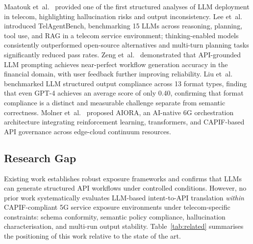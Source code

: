\documentclass[conference]{IEEEtran}
\begin{document}
Maatouk et~al.~\cite{maatouk2025} provided one of the first structured analyses
of LLM deployment in telecom, highlighting hallucination risks and output
inconsistency. Lee et~al.~\cite{telagentbench2025} introduced TelAgentBench,
benchmarking 15 LLMs across reasoning, planning, tool use, and RAG in a
telecom service environment; thinking-enabled models consistently outperformed
open-source alternatives and multi-turn planning tasks significantly reduced
pass rates. Zeng et~al.~\cite{flowmind2023} demonstrated that API-grounded LLM
prompting achieves near-perfect workflow generation accuracy in the financial
domain, with user feedback further improving reliability. Liu et~al.~\cite{liu2024}
benchmarked LLM structured output compliance across 13 format types, finding
that even GPT-4 achieves an average score of only 0.40, confirming that format
compliance is a distinct and measurable challenge separate from semantic
correctness. Molner et~al.~\cite{aiora2025} proposed AIORA, an AI-native 6G
orchestration architecture integrating reinforcement learning, transformers,
and CAPIF-based API governance across edge-cloud continuum resources.

\subsection{Research Gap}

Existing work establishes robust exposure frameworks and confirms that LLMs
can generate structured API workflows under controlled conditions. However,
no prior work systematically evaluates LLM-based intent-to-API translation
\emph{within} CAPIF-compliant 5G service exposure environments under
telecom-specific constraints: schema conformity, semantic policy compliance,
hallucination characterisation, and multi-run output stability.
Table~\ref{tab:related} summarises the positioning of this work relative
to the state of the art.
\end{document}
